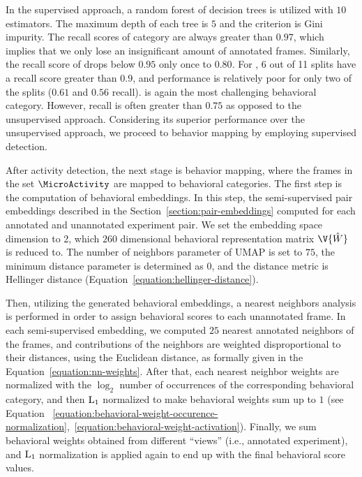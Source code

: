 In the supervised approach, a random forest of decision trees \citep{breiman_random_2001} is utilized with $10$ estimators. The maximum depth of each tree is $5$ and the criterion is Gini impurity.
The recall scores of \ProboscisPumping category are always greater than $0.97$, which implies that we only lose an insignificant amount of annotated frames.
Similarly, the recall score of \Feeding drops below $0.95$ only once to $0.80$.
For \ProboscisPumping, 6 out of 11 splits have a recall score greater than $0.9$, and performance is relatively poor for only two of the splits ($0.61$ and $0.56$ recall).
\CHaltereSwitch is again the most challenging behavioral category. However, recall is often greater than $0.75$ as opposed to the unsupervised approach.
Considering its superior performance over the unsupervised approach, we proceed to behavior mapping by employing supervised detection.

After activity detection, the next stage is behavior mapping, where the frames in the set $\MicroActivity$ are mapped to behavioral categories.
The first step is the computation of behavioral embeddings.
In this step, the semi-supervised pair embeddings described in the Section~\ref{section:pair-embeddings} computed for each annotated and unannotated experiment pair.
We set the embedding space dimension to 2, which $260$ dimensional behavioral representation matrix $\V{\hat{W}}$ is reduced to.
The number of neighbors parameter of UMAP is set to $75$, the minimum distance parameter is determined as $0$, and the distance metric is Hellinger distance (Equation~\ref{equation:hellinger-distance}).

Then, utilizing the generated behavioral embeddings, a nearest neighbors analysis is performed in order to assign behavioral scores to each unannotated frame.
In each semi-supervised embedding, we computed $25$ nearest annotated neighbors of the frames, and contributions of the neighbors are weighted disproportional to their distances, using the Euclidean distance, as formally given in the Equation~\ref{equation:nn-weights}.
After that, each nearest neighbor weights are normalized with the $\log_2$ number of occurrences of the corresponding behavioral category, and then $\textnormal{L}_1$ normalized to make behavioral weights sum up to $1$ (see Equation ~\ref{equation:behavioral-weight-occurence-normalization},~\ref{equation:behavioral-weight-activation}).
Finally, we sum behavioral weights obtained from different ``views'' (i.e., annotated experiment), and $\textnormal{L}_1$ normalization is applied again to end up with the final behavioral score values.

